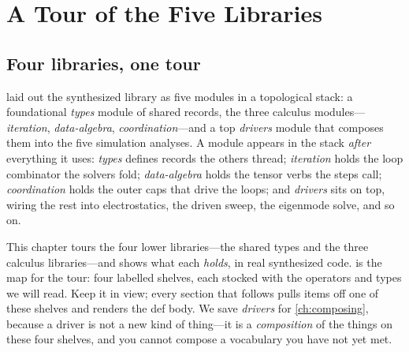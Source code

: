 \chapter{A Tour of the Five Libraries}
\label{ch:fivelibs}


\section{Four libraries, one tour}

 laid out the synthesized library as five modules in a
topological stack: a foundational \emph{types} module of shared records, the
three calculus modules---\emph{iteration}, \emph{data-algebra},
\emph{coordination}---and a top \emph{drivers} module that composes them into the
five simulation analyses. A module appears in the stack \emph{after} everything it
uses: \emph{types} defines records the others thread; \emph{iteration} holds the
loop combinator the solvers fold; \emph{data-algebra} holds the tensor verbs the
steps call; \emph{coordination} holds the outer caps that drive the loops; and
\emph{drivers} sits on top, wiring the rest into electrostatics, the driven sweep,
the eigenmode solve, and so on.

This chapter tours the four lower libraries---the shared types and the three
calculus libraries---and shows what each \emph{holds}, in real synthesized code.
 is the map for the tour: four labelled shelves, each stocked
with the operators and types we will read. Keep it in view; every section that
follows pulls items off one of these shelves and renders the def body. We save
\emph{drivers} for \cref{ch:composing}, because a driver is not a new kind of
thing---it is a \emph{composition} of the things on these four shelves, and you
cannot compose a vocabulary you have not yet met.

